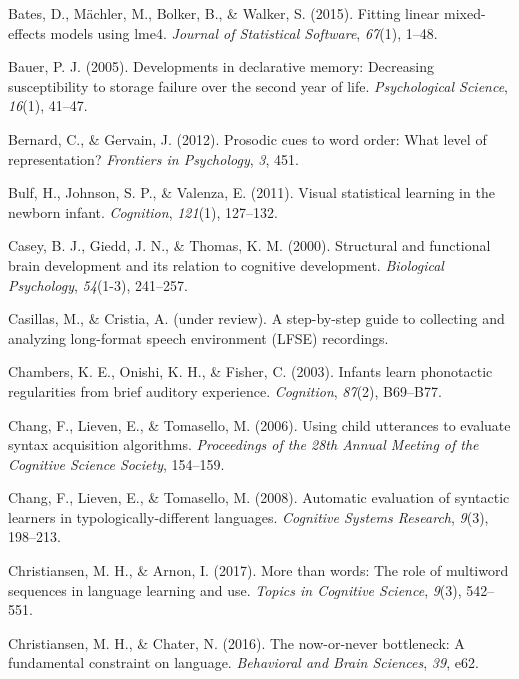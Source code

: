 \documentclass[man,mask,floatsintext]{apa6}
\begin{document}
\hypertarget{ref-lme4}{}
Bates, D., Mächler, M., Bolker, B., \& Walker, S. (2015). Fitting linear
mixed-effects models using lme4. \emph{Journal of Statistical Software},
\emph{67}(1), 1--48.

\hypertarget{ref-bauer2005developments}{}
Bauer, P. J. (2005). Developments in declarative memory: Decreasing
susceptibility to storage failure over the second year of life.
\emph{Psychological Science}, \emph{16}(1), 41--47.

\hypertarget{ref-bernard2012prosodic}{}
Bernard, C., \& Gervain, J. (2012). Prosodic cues to word order: What
level of representation? \emph{Frontiers in Psychology}, \emph{3}, 451.

\hypertarget{ref-bulf2011visual}{}
Bulf, H., Johnson, S. P., \& Valenza, E. (2011). Visual statistical
learning in the newborn infant. \emph{Cognition}, \emph{121}(1),
127--132.

\hypertarget{ref-casey2000structural}{}
Casey, B. J., Giedd, J. N., \& Thomas, K. M. (2000). Structural and
functional brain development and its relation to cognitive development.
\emph{Biological Psychology}, \emph{54}(1-3), 241--257.

\hypertarget{ref-casillasURstep}{}
Casillas, M., \& Cristia, A. (under review). A step-by-step guide to
collecting and analyzing long-format speech environment (LFSE)
recordings.

\hypertarget{ref-chambers2003infants}{}
Chambers, K. E., Onishi, K. H., \& Fisher, C. (2003). Infants learn
phonotactic regularities from brief auditory experience.
\emph{Cognition}, \emph{87}(2), B69--B77.

\hypertarget{ref-chang2006using}{}
Chang, F., Lieven, E., \& Tomasello, M. (2006). Using child utterances
to evaluate syntax acquisition algorithms. \emph{Proceedings of the 28th
Annual Meeting of the Cognitive Science Society}, 154--159.

\hypertarget{ref-chang2008automatic}{}
Chang, F., Lieven, E., \& Tomasello, M. (2008). Automatic evaluation of
syntactic learners in typologically-different languages. \emph{Cognitive
Systems Research}, \emph{9}(3), 198--213.

\hypertarget{ref-christiansen2017more}{}
Christiansen, M. H., \& Arnon, I. (2017). More than words: The role of
multiword sequences in language learning and use. \emph{Topics in
Cognitive Science}, \emph{9}(3), 542--551.

\hypertarget{ref-christiansen2016now}{}
Christiansen, M. H., \& Chater, N. (2016). The now-or-never bottleneck:
A fundamental constraint on language. \emph{Behavioral and Brain
Sciences}, \emph{39}, e62.
\end{document}
